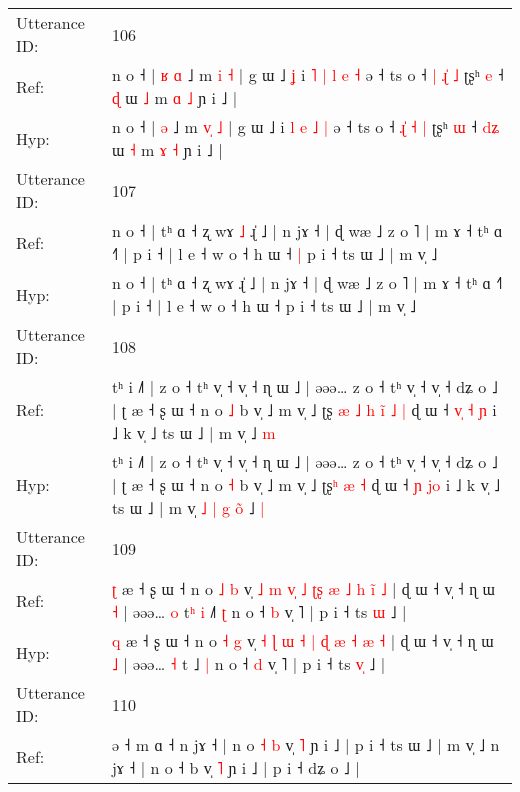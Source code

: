 \documentclass[10pt]{article}
\DeclareRobustCommand{\hl}[1]{{\textcolor{red}{#1}}}
\begin{document}
\begin{longtable}{ll}
\midrule
Utterance ID: & 106 \\
Ref: & n o ˧ |\hl{ }\hl{ʁ} \hl{ɑ} ˩ m \hl{}\hl{i} \hl{˧} | g ɯ ˩\hl{ }\hl{ʝ} i\hl{ }\hl{˥} \hl{|} \hl{l} \hl{e} \hl{˧} ə ˧ ts o ˧ \hl{|}\hl{ }\hl{ɻ}\hl{̍} \hl{˩} ʈʂʰ \hl{e} ˧ \hl{}\hl{ɖ} ɯ \hl{˩} m \hl{ɑ} \hl{˩} ɲ i ˩ |
 \\
Hyp: & n o ˧ |\hl{}\hl{} \hl{ə} ˩ m \hl{v}\hl{̩} \hl{˩} | g ɯ ˩\hl{}\hl{} i\hl{}\hl{} \hl{l} \hl{e} \hl{˩} \hl{|} ə ˧ ts o ˧ \hl{ɻ}\hl{̍}\hl{ }\hl{˧} \hl{|} ʈʂʰ \hl{ɯ} ˧ \hl{d}\hl{ʑ} ɯ \hl{˧} m \hl{ɤ} \hl{˧} ɲ i ˩ |
 \\
\midrule
Utterance ID: & 107 \\
Ref: & n o ˧ | tʰ ɑ ˧ ʐ wɤ\hl{ }\hl{˩} ɻ̍ ˩ | n jɤ ˧ | ɖ wæ ˩ z o ˥ | m ɤ ˧ tʰ ɑ ˧˥ | p i ˧ | l e ˧ w o ˧ h ɯ ˧\hl{ }\hl{|} p i ˧ ts ɯ ˩ | m v̩ ˩
 \\
Hyp: & n o ˧ | tʰ ɑ ˧ ʐ wɤ\hl{}\hl{} ɻ̍ ˩ | n jɤ ˧ | ɖ wæ ˩ z o ˥ | m ɤ ˧ tʰ ɑ ˧˥ | p i ˧ | l e ˧ w o ˧ h ɯ ˧\hl{}\hl{} p i ˧ ts ɯ ˩ | m v̩ ˩
 \\
\midrule
Utterance ID: & 108 \\
Ref: & tʰ i ˩˥ | z o ˧ tʰ v̩ ˧ v̩ ˧ ɳ ɯ ˩ | əəə… z o ˧ tʰ v̩ ˧ v̩ ˧ dʑ o ˩ | ʈ æ ˧ ʂ ɯ ˧ n o \hl{˩} b v̩ ˩ m v̩ ˩ ʈʂ\hl{ }\hl{æ}\hl{ }\hl{˩}\hl{ }\hl{h}\hl{ }\hl{i}\hl{̃} \hl{˩} \hl{|} ɖ ɯ ˧ \hl{v}\hl{̩} \hl{˧}\hl{ }\hl{ɲ} i ˩ k v̩ ˩ ts ɯ ˩ | m v̩\hl{}\hl{}\hl{}\hl{}\hl{}\hl{}\hl{}\hl{}\hl{} ˩ \hl{m}
 \\
Hyp: & tʰ i ˩˥ | z o ˧ tʰ v̩ ˧ v̩ ˧ ɳ ɯ ˩ | əəə… z o ˧ tʰ v̩ ˧ v̩ ˧ dʑ o ˩ | ʈ æ ˧ ʂ ɯ ˧ n o \hl{˧} b v̩ ˩ m v̩ ˩ ʈʂ\hl{}\hl{}\hl{}\hl{}\hl{}\hl{}\hl{}\hl{}\hl{ʰ} \hl{æ} \hl{˧} ɖ ɯ ˧ \hl{}\hl{ɲ} \hl{}\hl{j}\hl{o} i ˩ k v̩ ˩ ts ɯ ˩ | m v̩\hl{ }\hl{˩}\hl{ }\hl{|}\hl{ }\hl{g}\hl{ }\hl{o}\hl{̃} ˩ \hl{|}
 \\
\midrule
Utterance ID: & 109 \\
Ref: & \hl{ʈ} æ ˧ ʂ ɯ ˧ n o \hl{˩} \hl{b} v̩ \hl{˩} \hl{m} \hl{v}\hl{̩} \hl{˩} \hl{ʈ}\hl{ʂ} \hl{æ} \hl{˩} \hl{h} \hl{i}\hl{̃} \hl{˩} | ɖ ɯ ˧ v̩ ˧ ɳ ɯ \hl{˧} | əəə… \hl{o} t\hl{ʰ}\hl{ }\hl{i} ˩\hl{˥} \hl{ʈ} n o ˧ \hl{b} v̩ ˥ | p i ˧ ts \hl{}\hl{ɯ} ˩ |
 \\
Hyp: & \hl{q} æ ˧ ʂ ɯ ˧ n o \hl{˧} \hl{g} v̩ \hl{˧} \hl{ɭ} \hl{}\hl{ɯ} \hl{˧} \hl{}\hl{|} \hl{ɖ} \hl{æ} \hl{˧} \hl{}\hl{æ} \hl{˧} | ɖ ɯ ˧ v̩ ˧ ɳ ɯ \hl{˩} | əəə… \hl{˧} t\hl{}\hl{}\hl{} ˩\hl{} \hl{|} n o ˧ \hl{d} v̩ ˥ | p i ˧ ts \hl{v}\hl{̩} ˩ |
 \\
\midrule
Utterance ID: & 110 \\
Ref: & ə ˧ m ɑ ˧\hl{}\hl{}\hl{}\hl{}\hl{}\hl{}\hl{}\hl{} n jɤ ˧ | n o \hl{˧} \hl{b} v̩ \hl{˥} ɲ i ˩ | p i ˧ ts ɯ ˩ | m v̩ ˩\hl{}\hl{} n jɤ ˧ | n o ˧ b v̩ \hl{˥} ɲ i ˩ | p i ˧ dʑ o ˩ |

\end{longtable}
\end{document}
